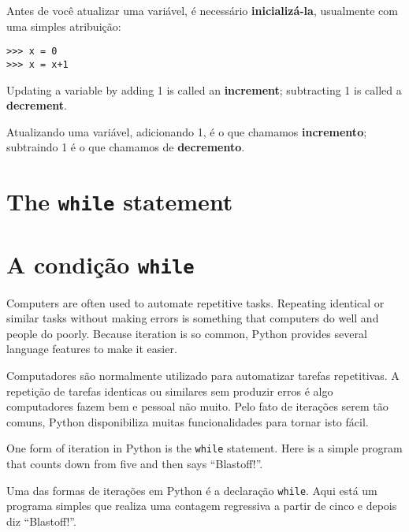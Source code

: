 Antes de você atualizar uma variável, é necessário {\bf inicializá-la},
usualmente com uma simples atribuição:


\beforeverb
\begin{verbatim}
>>> x = 0
>>> x = x+1
\end{verbatim}
\afterverb
%
Updating a variable by adding 1 is called an {\bf increment};
subtracting 1 is called a {\bf decrement}.

%
Atualizando uma variável, adicionando 1, é o que chamamos {\bf incremento};
subtraindo 1 é o que chamamos de {\bf decremento}.



\section{The {\tt while} statement}
\section{A condição {\tt while}}



Computers are often used to automate repetitive tasks.  Repeating
identical or similar tasks without making errors is something that
computers do well and people do poorly.
Because iteration is so common, Python provides several
language features to make it easier.  

Computadores são normalmente utilizado para automatizar tarefas repetitivas.
A repetição de tarefas identicas ou similares sem produzir erros é algo
computadores fazem bem e pessoal não muito. Pelo fato de iterações serem tão
comuns, Python disponibiliza muitas funcionalidades para tornar isto fácil.

One form of iteration in Python is the {\tt while} statement.  Here is 
a simple program that counts down from five and then says ``Blastoff!''.

Uma das formas de iterações em Python é a declaração {\tt while}. Aqui está
um programa simples que realiza uma contagem regressiva a partir de cinco e
depois diz ``Blastoff!''.

